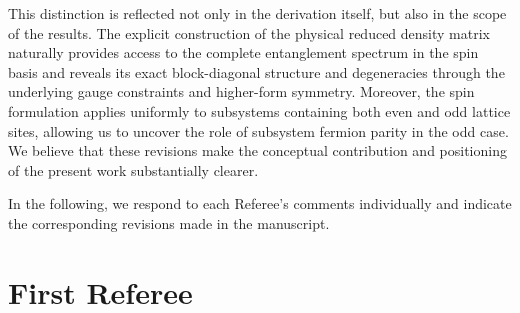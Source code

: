 \documentclass[12pt]{article}
\begin{document}
This distinction is reflected not only in the derivation itself, but also in the scope of the results. The explicit construction of the physical reduced density matrix naturally provides access to the complete entanglement spectrum in the spin basis and reveals its exact block-diagonal structure and degeneracies through the underlying gauge constraints and higher-form symmetry. Moreover, the spin formulation applies uniformly to subsystems containing both even and odd lattice sites, allowing us to uncover the role of subsystem fermion parity in the odd case. We believe that these revisions make the conceptual contribution and positioning of the present work substantially clearer.

In the following, we respond to each Referee's comments individually and indicate the corresponding revisions made in the manuscript.


\section*{First Referee}
\end{document}
